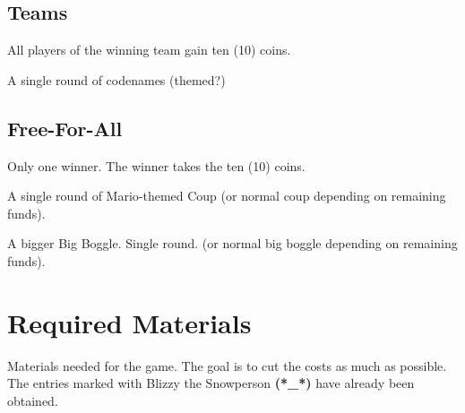 \documentclass{article}
\begin{document}
\subsection{Teams}

All players of the winning team gain ten (10) coins.

\begin{description}[style=nextline]
\item[Codenames] A single round of codenames (themed?)
\item[...]
\end{description}

\subsection{Free-For-All}

Only one winner.  The winner takes the ten (10) coins.

\begin{description}[style=nextline]
\item[Coup] A single round of Mario-themed Coup (or normal coup depending on remaining funds).
\item[Boggled] A bigger Big Boggle.  Single round. (or normal big boggle depending on remaining funds).
\item[...]
\end{description}

\section{Required Materials}

Materials needed for the game.  The goal is to cut the costs as much as possible.
The entries marked with Blizzy the Snowperson \textbf{(*\_*)} have already been obtained.
\end{document}
